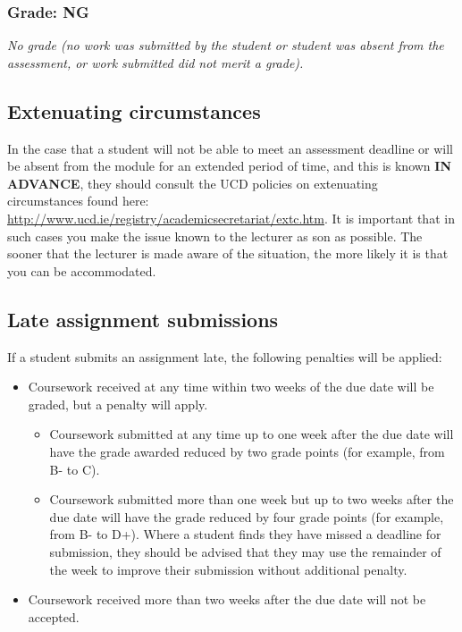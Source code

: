 \subsubsection*{Grade: NG}

\textit{No grade (no work was submitted by the student or student was absent from the assessment, or work submitted did not merit a grade).}

\subsection*{Extenuating circumstances}

In the case that a student will not be able to meet an assessment deadline or will be absent from the module for an extended period of time, and this is known \textbf{IN ADVANCE}, they should consult the UCD policies on extenuating circumstances found here:
\url{http://www.ucd.ie/registry/academicsecretariat/extc.htm}. It is important that in such cases you make the issue known to the lecturer as son as possible. The sooner that the lecturer is made aware of the situation, the more likely it is that you can be accommodated.

\subsection*{Late assignment submissions}

If a student submits an assignment late, the following penalties will be applied:

\begin{itemize}
	\item Coursework received at any time within two weeks of the due date will be graded, but a penalty will apply.
	\begin{itemize}
		\item Coursework submitted at any time up to one week after the due date will have the grade awarded reduced by two grade points (for example, from B- to C).
		\item Coursework submitted more than one week but up to two weeks after the due date will have the grade reduced by four grade points (for example, from B- to D+).
Where a student finds they have missed a deadline for submission, they should be advised that they may use the remainder of the week to improve their submission without additional penalty.
	\end{itemize}
	\item Coursework received more than two weeks after the due date will not be accepted.
\end{itemize}
